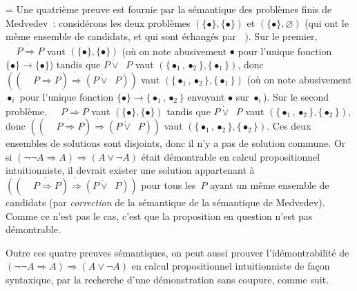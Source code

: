\documentclass[12pt,a4paper]{article}
\theoremstyle{definition}
\newcommand{\dottedlimp}{\mathbin{\dot\Rightarrow}}
\newcommand{\dottedlor}{\mathbin{\dot\lor}}
\newcommand{\dottedneg}{\mathop{\dot\neg}}
\newif\ifcorrige
\newenvironment{corrige}%
{\ifcorrige\relax\else\setbox0=\vbox\bgroup\fi%
\smallbreak\footnotesize\noindent{\underbar{\textit{Corrigé.}}\quad}}
{{\hbox{}\nobreak\hfill\checkmark}%
\ifcorrige\relax\else\egroup\fi\par}
\begin{document}
\begin{corrige}
Une quatrième preuve est fournie par la sémantique des problèmes finis
de Medvedev : considérons les deux problèmes
$(\{\bullet\},\{\bullet\})$ et $(\{\bullet\},\varnothing)$ (qui ont le
même ensemble de candidats, et qui sont échangés par $\dottedneg$).
Sur le premier, $\dottedneg\dottedneg P \dottedlimp P$ vaut
$(\{\bullet\},\{\bullet\})$ (où on note abusivement $\bullet$ pour
l'unique fonction $\{\bullet\} \to \{\bullet\}$) tandis que $P
\dottedlor \dottedneg P$ vaut $(\{\bullet_1,\bullet_2\},
\{\bullet_1\})$, donc $((\dottedneg\dottedneg P \dottedlimp P)
\dottedlimp (P \dottedlor \dottedneg P))$ vaut
$(\{\bullet_1,\bullet_2\}, \{\bullet_1\})$ (où on note abusivement
$\bullet_i$ pour l'unique fonction $\{\bullet\} \to
\{\bullet_1,\bullet_2\}$ envoyant $\bullet$ sur $\bullet_i$).  Sur le
second problème, $\dottedneg\dottedneg P \dottedlimp P$ vaut
$(\{\bullet\},\{\bullet\})$ tandis que $P \dottedlor \dottedneg P$
vaut $(\{\bullet_1,\bullet_2\}, \{\bullet_2\})$, donc
$((\dottedneg\dottedneg P \dottedlimp P) \dottedlimp (P \dottedlor
\dottedneg P))$ vaut $(\{\bullet_1,\bullet_2\}, \{\bullet_2\})$.  Ces
deux ensembles de solutions sont disjoints, donc il n'y a pas de
solution commune.  Or si $(\neg\neg A \Rightarrow A) \Rightarrow (A
\lor \neg A)$ était démontrable en calcul propositionnel
intuitionniste, il devrait exister une solution appartenant à
$((\dottedneg\dottedneg P \dottedlimp P) \dottedlimp (P \dottedlor
\dottedneg P))$ pour tous les $P$ ayant un même ensemble de candidats
(par \emph{correction} de la sémantique de la sémantique de Medvedev).
Comme ce n'est pas le cas, c'est que la proposition en question n'est
pas démontrable.

Outre ces quatre preuves sémantiques, on peut aussi prouver
l'idémontrabilité de $(\neg\neg A \Rightarrow A) \Rightarrow (A \lor
\neg A)$ en calcul propositionnel intuitionniste de façon syntaxique,
par la recherche d'une démonstration sans coupure, comme suit.


\end{corrige}
\end{document}
